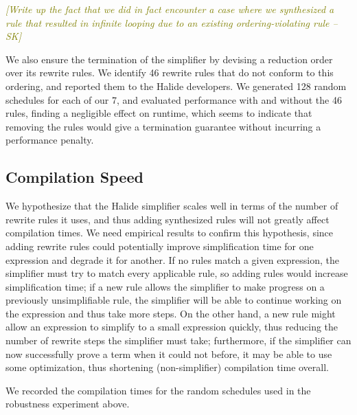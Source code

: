 \documentclass[sigplan,10pt,review,anonymous]{acmart}\settopmatter{printfolios=true,printccs=false,printacmref=false}
\newcommand{\sak}[1]{\textcolor{olive}{\textit{[{#1} --SK]}}}
\newcommand{\NumApps}{{\color{red} 7}\xspace}
\newcommand{\NumOrderingProblems}{{\color{red} 46}\xspace}
\begin{document}
\sak{Write up the fact that we did in fact encounter a case where we
  synthesized a rule that resulted in infinite looping due to an existing
  ordering-violating rule}

We also ensure the termination of the simplifier by devising a reduction order
over its rewrite rules. We identify \NumOrderingProblems rewrite rules that do
not conform to this ordering, and reported them to the Halide developers. We generated 128 random schedules for each of our \NumApps, and evaluated performance with and without the \NumOrderingProblems rules, finding a negligible effect on runtime, which seems to indicate that removing the rules would give a termination guarantee without incurring a performance penalty.

\subsection{Compilation Speed}
\label{ssec:compilationspeed}

We hypothesize that the Halide simplifier scales well in terms of the number of rewrite rules it uses, and thus adding synthesized rules will not greatly affect compilation times. We need empirical results to confirm this hypothesis, since adding rewrite rules could potentially improve simplification time for one expression and degrade it for another. If no rules match a given expression, the simplifier must try to match every applicable rule, so adding rules would increase simplification time; if a new rule allows the simplifier to make progress on a previously unsimplifiable rule, the simplifier will be able to continue working on the expression and thus take more steps. On the other hand, a new rule might allow an expression to simplify to a small expression quickly, thus reducing the number of rewrite steps the simplifier must take; furthermore, if the simplifier can now successfully prove a term when it could not before, it may be able to use some optimization, thus shortening (non-simplifier) compilation time overall.

We recorded the compilation times for the random schedules used in the robustness experiment above.
\end{document}
